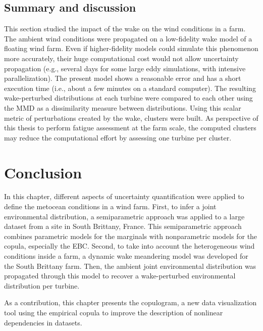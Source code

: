 \subsection{Summary and discussion}
This section studied the impact of the wake on the wind conditions in a farm. 
The ambient wind conditions were propagated on a low-fidelity wake model of a floating wind farm. 
Even if higher-fidelity models could simulate this phenomenon more accurately, their huge computational cost would not allow uncertainty propagation (e.g., several days for some large eddy simulations, with intensive parallelization). 
The present model shows a reasonable error and has a short execution time (i.e., about a few minutes on a standard computer). 
The resulting wake-perturbed distributions at each turbine were compared to each other using the MMD as a dissimilarity measure between distributions. 
Using this scalar metric of perturbations created by the wake, clusters were built.  
As perspective of this thesis to perform fatigue assessment at the farm scale, the computed clusters may reduce the computational effort by assessing one turbine per cluster.    


\section{Conclusion}

In this chapter, different aspects of uncertainty quantification were applied to define the metocean conditions in a wind farm. 
First, to infer a joint environmental distribution, a semiparametric approach was applied to a large dataset from a site in South Brittany, France. 
This semiparametric approach combines parametric models for the marginals with nonparametric models for the copula, especially the EBC.  
Second, to take into account the heterogeneous wind conditions inside a farm, a dynamic wake meandering model was developed for the South Brittany farm. 
Then, the ambient joint environmental distribution was propagated through this model to recover a wake-perturbed environmental distribution per turbine.  

As a contribution, this chapter presents the copulogram, a new data visualization tool using the empirical copula to improve the description of nonlinear dependencies in datasets.  

